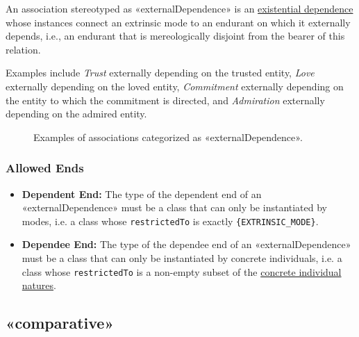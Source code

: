 An association stereotyped as «externalDependence» is an \hyperref[stereotype:existential-dependence]{existential dependence} whose instances connect an extrinsic mode to an endurant on which it externally depends, i.e., an endurant that is mereologically disjoint from the bearer of this relation.

Examples include \textit{Trust} externally depending on the trusted entity, \textit{Love} externally depending on the loved entity, \textit{Commitment} externally depending on the entity to which the commitment is directed, and \textit{Admiration} externally depending on the admired entity.

\begin{figure}[h]
    \centering
    
    \caption{Examples of associations categorized as «externalDependence».}
    \label{fig:externalDependence-example}
\end{figure}


\subsubsection{Allowed Ends}

\begin{itemize}
    \item \textbf{Dependent End:} The type of the dependent end of an «externalDependence» must be a class that can only be instantiated by modes, i.e. a class whose \texttt{restrictedTo} is exactly \texttt{\{EXTRINSIC\_MODE\}}.
    \item \textbf{Dependee End:} The type of the dependee end of an «externalDependence» must be a class that can only be instantiated by concrete individuals, i.e. a class whose  \texttt{restrictedTo} is a non-empty subset of the \hyperref[par:concrete-individual-nature]{concrete individual natures}.

\end{itemize}




\subsection{«comparative»}
\label{stereotype:comparative}

